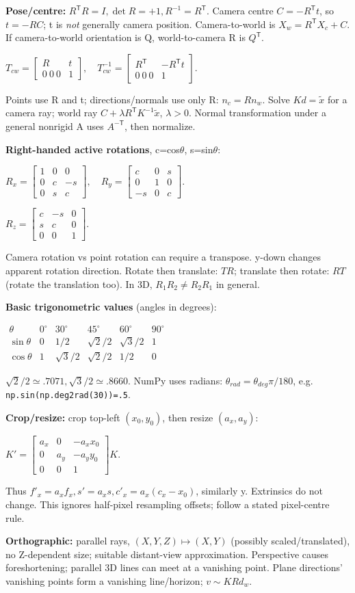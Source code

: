 \documentclass[a4paper]{article}
\newcommand{\key}[1]{\textbf{#1}}
\newcommand{\eq}[1]{\par\noindent\mbox{\(\displaystyle #1\)}\par}
\newcommand{\smat}[1]{\left[\begin{smallmatrix}#1\end{smallmatrix}\right]}
\newcommand{\trans}{^{\mathsf T}}
\newcommand{\inv}{^{-1}}
\newcounter{sheet}
\newcounter{sheetcolumn}
\newlength{\colwidth}
\newenvironment{sheetcol}[1][7.0]{\stepcounter{sheetcolumn}
  \begin{lrbox}{\columnbox}\begin{minipage}[t]{\colwidth}\vspace{0pt}
  \fontsize{#1}{\dimexpr#1pt+0.6pt\relax}\selectfont}
  {\end{minipage}\end{lrbox}
  \typeout{CV1COL|\thesheet|\thesheetcolumn|\the\dimexpr\ht\columnbox+\dp\columnbox\relax}
  \usebox{\columnbox}\ignorespacesafterend}
\begin{document}
\begin{sheetcol}[6.85]
\key{Pose/centre:} \(R\trans R=I,\det R=+1, R\inv=R\trans\). Camera centre \(C=-R\trans t\), so \(t=-RC\); t is \emph{not} generally camera position. Camera-to-world is \(X_w=R\trans X_c+C\). If camera-to-world orientation is Q, world-to-camera R is \(Q\trans\).
\eq{T_{cw}=\smat{R&t\\0\ 0\ 0&1},\quad
 T_{cw}\inv=\smat{R\trans&-R\trans t\\0\ 0\ 0&1}.}
Points use R and t; directions/normals use only R: \(n_c=Rn_w\). Solve \(Kd=\tilde x\) for a camera ray; world ray \(C+\lambda R\trans K\inv\tilde x\), \(\lambda>0\). Normal transformation under a general nonrigid A uses \(A^{-\mathsf T}\), then normalize.

\key{Right-handed active rotations}, c=cos\(\theta\), s=sin\(\theta\):
\eq{R_x=\smat{1&0&0\\0&c&-s\\0&s&c},\quad
 R_y=\smat{c&0&s\\0&1&0\\-s&0&c}.}
\eq{R_z=\smat{c&-s&0\\s&c&0\\0&0&1}.}
Camera rotation vs point rotation can require a transpose. y-down changes apparent rotation direction. Rotate then translate: \(TR\); translate then rotate: \(RT\) (rotate the translation too). In 3D, \(R_1R_2\ne R_2R_1\) in general.

\key{Basic trigonometric values} (angles in degrees):
\eq{\begin{array}{c|ccccc}
\theta&0^\circ&30^\circ&45^\circ&60^\circ&90^\circ\\
\sin\theta&0&1/2&\sqrt2/2&\sqrt3/2&1\\
\cos\theta&1&\sqrt3/2&\sqrt2/2&1/2&0
\end{array}}
\(\sqrt2/2\simeq.7071,\sqrt3/2\simeq.8660\). NumPy uses radians: \(\theta_{rad}=\theta_{deg}\pi/180\), e.g. \texttt{np.sin(np.deg2rad(30))=.5}.

\key{Crop/resize:} crop top-left \((x_0,y_0)\), then resize \((a_x,a_y)\):
\eq{K'=\smat{a_x&0&-a_xx_0\\0&a_y&-a_yy_0\\0&0&1}K.}
Thus \(f'_x=a_xf_x,s'=a_xs,c'_x=a_x(c_x-x_0)\), similarly y. Extrinsics do not change. This ignores half-pixel resampling offsets; follow a stated pixel-centre rule.

\key{Orthographic:} parallel rays, \((X,Y,Z)\mapsto(X,Y)\) (possibly scaled/translated), no Z-dependent size; suitable distant-view approximation. Perspective causes foreshortening; parallel 3D lines can meet at a vanishing point. Plane directions' vanishing points form a vanishing line/horizon; \(v\sim KRd_w\).


\end{sheetcol}
\end{document}
